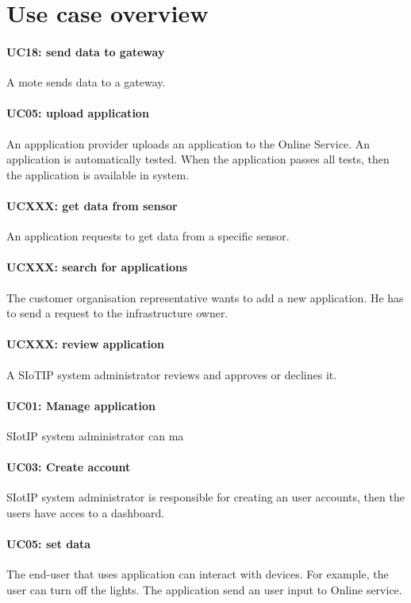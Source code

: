 \section{Use case overview}\label{sec:uc_overview}

\paragraph{UC18: send data to gateway}
A mote sends data to a gateway.
\paragraph{UC05: upload application}
An appplication provider uploads an application to the Online Service.
An application is automatically tested. When the application passes all tests, then the application
is available in system.
\paragraph{UCXXX: get data from sensor}
An application requests to get data from a specific sensor.
\paragraph{UCXXX: search for applications}
The customer organisation representative wants to add a new application. He has
to send a request to the infrastructure owner.
\paragraph{UCXXX: review application}
A SIoTIP system administrator reviews and approves or declines it.
\paragraph{UC01: Manage application}
SIotIP system administrator can ma
\paragraph{UC03: Create account}
SIotIP system administrator is responsible for creating an user accounts, then
the users have acces to a dashboard.
\paragraph{UC05: set data}
The end-user that uses application can interact with devices. For example, the user
can turn off the lights. The application send an user input to Online service.
